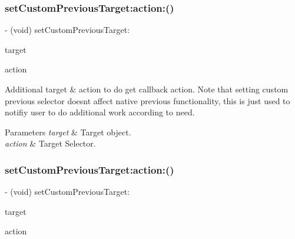 \subsubsection{\texorpdfstring{set\+Custom\+Previous\+Target\+:action\+:()}{setCustomPreviousTarget:action:()}\hspace{0.1cm}{\footnotesize\ttfamily [2/3]}}
{\footnotesize\ttfamily -\/ (void) set\+Custom\+Previous\+Target\+: \begin{DoxyParamCaption}\item[{(nullable id)}]{target }\item[{action:(nullable S\+EL)}]{action }\end{DoxyParamCaption}}

Additional target \& action to do get callback action. Note that setting custom {\ttfamily previous} selector doesn\textquotesingle{}t affect native {\ttfamily previous} functionality, this is just used to notifiy user to do additional work according to need.


\begin{DoxyParams}{Parameters}
{\em target} & Target object. \\
\hline
{\em action} & Target Selector. \\
\hline
\end{DoxyParams}
\mbox{\label{category_u_i_view_07_i_q_toolbar_addition_08_a7170d976e22d5df5621b45bbebf52a67}} 
\subsubsection{\texorpdfstring{set\+Custom\+Previous\+Target\+:action\+:()}{setCustomPreviousTarget:action:()}\hspace{0.1cm}{\footnotesize\ttfamily [3/3]}}
{\footnotesize\ttfamily -\/ (void) set\+Custom\+Previous\+Target\+: \begin{DoxyParamCaption}\item[{(nullable id)}]{target }\item[{action:(nullable S\+EL)}]{action }\end{DoxyParamCaption}}

